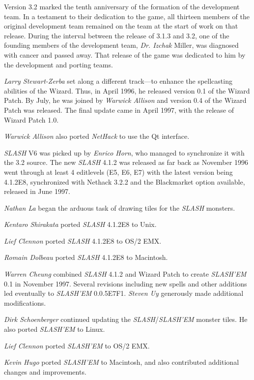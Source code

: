 Version 3.2 marked the tenth anniversary of the formation of the development
team.  In a testament to their dedication to the game, all thirteen members
of the original development team remained on the team at the start of work
on that release.  During the interval between the release of 3.1.3
and 3.2, one of the founding members of the development team, {\it Dr. Izchak}
Miller, was diagnosed with cancer and passed away.  That release of the
game was dedicated to him by the development and porting teams.

{\it Larry Stewart-Zerba\/} set along a different track---to enhance the
spellcasting abilities of the Wizard.   Thus, in April 1996,  he released
version 0.1 of the Wizard Patch.  By July,  he was joined by
{\it Warwick Allison\/} and version 0.4 of the Wizard Patch was released.
The final update came in April 1997,  with the release of
Wizard Patch 1.0.

{\it Warwick Allison\/} also ported {\it NetHack\/} to use the Qt interface.

{\it SLASH\/} V6 was picked up by {\it Enrico Horn}, who managed to synchronize it with
the 3.2 source.  The new {\it SLASH\/} 4.1.2 was released as far back as November
1996 went through at least 4 editlevels (E5, E6, E7)
with the latest version being 4.1.2E8,  synchronized with Nethack 3.2.2 and
the Blackmarket option available,  released in June 1997.

{\it Nathan La\/} began the arduous task of drawing tiles for the {\it SLASH\/} monsters.

{\it Kentaro Shirakata\/} ported {\it SLASH\/} 4.1.2E8 to Unix.

{\it Lief Clennon\/} ported {\it SLASH\/} 4.1.2E8 to OS/2 EMX.

{\it Romain Dolbeau\/} ported {\it SLASH\/} 4.1.2E8 to Macintosh.

{\it Warren Cheung\/} combined {\it SLASH\/} 4.1.2 and Wizard Patch to create
{\it SLASH'EM\/} 0.1 in November 1997.  Several revisions including new spells and
other additions led eventually to {\it SLASH'EM\/} 0.0.5E7F1. {\it Steven Uy\/}
generously made additional modifications.

{\it Dirk Schoenberger\/} continued updating the {\it SLASH\/}/{\it SLASH'EM\/} monster
tiles.  He also ported {\it SLASH'EM\/} to Linux.

{\it Lief Clennon\/} ported {\it SLASH'EM\/} to OS/2 EMX.

{\it Kevin Hugo\/} ported {\it SLASH'EM\/} to Macintosh,  and also contributed
additional changes and improvements.

